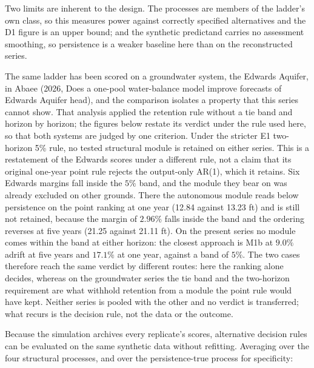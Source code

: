 \documentclass[11pt]{article}
\begin{document}
Two limits are inherent to the design. The processes are members of the ladder's own class, so this measures power
against correctly specified alternatives and the D1 figure is an upper
bound; and the synthetic predictand carries no assessment smoothing, so
persistence is a weaker baseline here than on the reconstructed series.

The same ladder has been scored on a groundwater system, the Edwards
Aquifer, in Abaee (2026, Does a one-pool water-balance model improve forecasts of Edwards Aquifer head), and the comparison isolates a property that
this series cannot show. That analysis applied the retention rule
without a tie band and horizon by horizon; the figures below restate its
verdict under the rule used here, so that both systems are judged by one
criterion. Under the stricter E1 two-horizon 5\% rule, no tested structural
module is retained on either series. This is a restatement of the Edwards
scores under a different rule, not a claim that its original one-year
point rule rejects the output-only AR(1), which it retains. Six Edwards margins fall
inside the \(5\%\) band, and the module they bear on was already
excluded on other grounds. There the autonomous module reads below
persistence on the point ranking at one year (12.84 against 13.23 ft)
and is still not retained, because the margin of \(2.96\%\) falls
inside the band and the ordering reverses at five years (21.25 against
21.11 ft). On the present
series no module comes within the band at either horizon: the closest
approach is M1b at \(9.0\%\) adrift at five years and \(17.1\%\) at one
year, against a band of \(5\%\). The two cases therefore reach the same verdict by
different routes: here the ranking alone decides, whereas on the
groundwater series the tie band and the two-horizon requirement are what
withhold retention from a module the point rule would have kept. Neither
series is pooled with the other and no verdict is transferred; what
recurs is the decision rule, not the data or the outcome.

Because the simulation archives every replicate's scores, alternative
decision rules can be evaluated on the same synthetic data without
refitting. Averaging over the four structural processes, and over the
persistence-true process for specificity:
\end{document}
